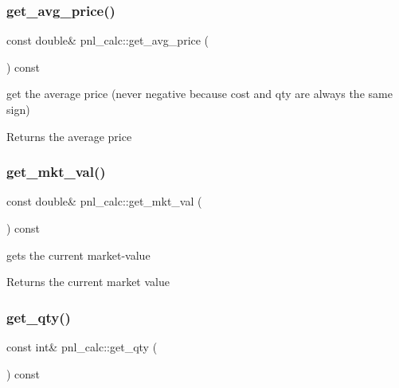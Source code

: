 \subsubsection{\texorpdfstring{get\+\_\+avg\+\_\+price()}{get\_avg\_price()}}
{\footnotesize\ttfamily const double\& pnl\+\_\+calc\+::get\+\_\+avg\+\_\+price (\begin{DoxyParamCaption}{ }\end{DoxyParamCaption}) const}



get the average price (never negative because cost and qty are always the same sign) 

\begin{DoxyReturn}{Returns}
the average price 
\end{DoxyReturn}
\mbox{\label{classpnl__calc_a02d80e8a30ca4d9423961a3600ced266}} 
\subsubsection{\texorpdfstring{get\+\_\+mkt\+\_\+val()}{get\_mkt\_val()}}
{\footnotesize\ttfamily const double\& pnl\+\_\+calc\+::get\+\_\+mkt\+\_\+val (\begin{DoxyParamCaption}{ }\end{DoxyParamCaption}) const}



gets the current market-\/value 

\begin{DoxyReturn}{Returns}
the current market value 
\end{DoxyReturn}
\mbox{\label{classpnl__calc_ae85f96910ab2ca12da816e3d20f69134}} 
\subsubsection{\texorpdfstring{get\+\_\+qty()}{get\_qty()}}
{\footnotesize\ttfamily const int\& pnl\+\_\+calc\+::get\+\_\+qty (\begin{DoxyParamCaption}{ }\end{DoxyParamCaption}) const}



